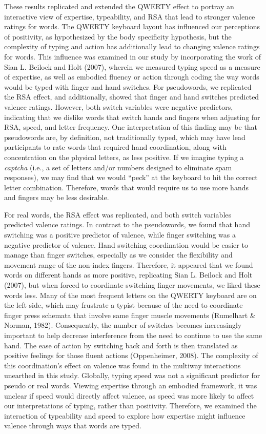 \documentclass[
  english,
  man]{apa7}
\begin{document}
These results replicated and extended the QWERTY effect to portray an interactive view of expertise, typeability, and RSA that lead to stronger valence ratings for words. The QWERTY keyboard layout has influenced our perceptions of positivity, as hypothesized by the body specificity hypothesis, but the complexity of typing and action has additionally lead to changing valence ratings for words. This influence was examined in our study by incorporating the work of Sian L. Beilock and Holt (2007), wherein we measured typing speed as a measure of expertise, as well as embodied fluency or action through coding the way words would be typed with finger and hand switches. For pseudowords, we replicated the RSA effect, and additionally, showed that finger and hand switches predicted valence ratings. However, both switch variables were negative predictors, indicating that we dislike words that switch hands and fingers when adjusting for RSA, speed, and letter frequency. One interpretation of this finding may be that pseudowords are, by definition, not traditionally typed, which may have lead participants to rate words that required hand coordination, along with concentration on the physical letters, as less positive. If we imagine typing a \emph{captcha} (i.e., a set of letters and/or numbers designed to eliminate spam responses), we may find that we would ``peck'' at the keyboard to hit the correct letter combination. Therefore, words that would require us to use more hands and fingers may be less desirable.

For real words, the RSA effect was replicated, and both switch variables predicted valence ratings. In contrast to the pseudowords, we found that hand switching was a positive predictor of valence, while finger switching was a negative predictor of valence. Hand switching coordination would be easier to manage than finger switches, especially as we consider the flexibility and movement range of the non-index fingers. Therefore, it appeared that we found words on different hands as more positive, replicating Sian L. Beilock and Holt (2007), but when forced to coordinate switching finger movements, we liked these words less. Many of the most frequent letters on the QWERTY keyboard are on the left side, which may frustrate a typist because of the need to coordinate finger press schemata that involve same finger muscle movements (Rumelhart \& Norman, 1982). Consequently, the number of switches becomes increasingly important to help decrease interference from the need to continue to use the same hand. The ease of action by switching back and forth is then translated as positive feelings for those fluent actions (Oppenheimer, 2008). The complexity of this coordination's effect on valence was found in the multiway interactions unearthed in this study. Globally, typing speed was not a significant predictor for pseudo or real words. Viewing expertise through an embodied framework, it was unclear if speed would directly affect valence, as speed was more likely to affect our interpretations of typing, rather than positivity. Therefore, we examined the interaction of typeability and speed to explore how expertise might influence valence through ways that words are typed.
\end{document}
